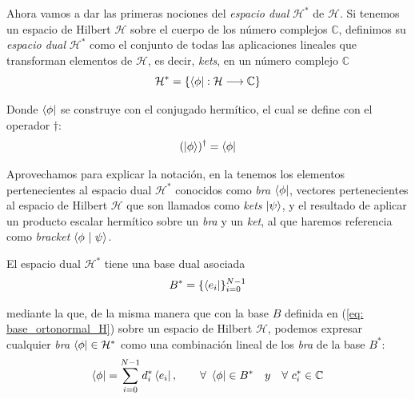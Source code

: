 \documentclass[12pt]{article}
\numberwithin{equation}{section} %
\begin{document}
    \vspace{5mm}

    Ahora vamos a dar las primeras nociones del \textit{espacio dual} \( \mathcal{H} ^ {*} \) de \( \mathcal{H} \). Si tenemos un espacio de Hilbert \( \mathcal{H} \) sobre el cuerpo de los número complejos \( \mathbb{C} \), definimos su \textit{espacio dual} \( \mathcal{H} ^ {*} \) como el conjunto de todas las aplicaciones lineales que transforman elementos de \( \mathcal{H} \), es decir, \textit{kets}, en un número complejo \( \mathbb{C} \)
    \begin{equation*}
        \mathcal{H} ^ {*} = \{ \bra{\phi}: \mathcal{H} \longrightarrow \mathbb{C} \}
    \end{equation*}

    \vspace{1.5mm}

    Donde \( \bra{\phi} \) se construye con el conjugado hermítico, el cual se define con el operador \( \dagger \):
    \begin{equation}
        ( \ket{\phi} )^{\dagger} = \bra{\phi}
        \label{eq: conjugado_hermitico}
    \end{equation}

    \vspace{1.5mm}

    Aprovechamos para explicar la notación, en la tenemos los elementos pertenecientes al espacio dual \( \mathcal{H} ^ {*} \) conocidos como \textit{bra} \( \bra{\phi} \), vectores pertenecientes al espacio de Hilbert \( \mathcal{H} \) que son llamados como \textit{kets} \( \ket{\psi} \), y el resultado de aplicar un producto escalar hermítico sobre un \textit{bra} y un \textit{ket}, al que haremos referencia como \textit{bracket} \( \braket{\phi \ | \ \psi} \).

    \vspace{5mm}

    El espacio dual \( \mathcal{H} ^ {*} \) tiene una base dual asociada
    \begin{equation}
        B ^ {*} = \{ \bra{e_{i}} \} _{i = 0}^{N - 1}
    \end{equation}

    \vspace{1.5mm}

    mediante la que, de la misma manera que con la base \( B \) definida en (\ref{eq: base_ortonormal_H}) sobre un espacio de Hilbert \( \mathcal{H} \), podemos expresar cualquier \textit{bra} \( \bra{\phi} \in \mathcal{H} ^ {*} \) como una combinación lineal de los \textit{bra} de la base \( B ^ {*} \):
    \begin{equation}
        \bra{\phi} = \sum_{i = 0}^{N - 1} d_{i}^{*} \bra{e_{i}}, \qquad \forall \ \bra{\phi} \in B^{*} \quad y \quad \forall \ c_{i}^{*} \in \mathbb{C}
        \label{eq: combinacion_lineal_hilbert_dual}
    \end{equation}    
\end{document}
